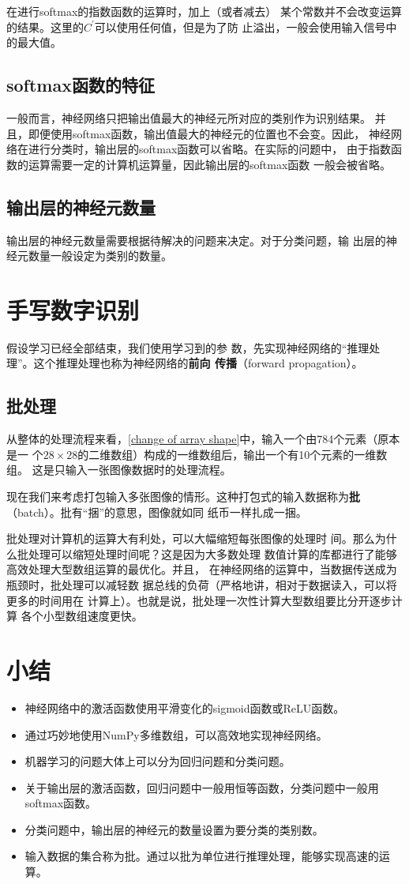 在进行softmax的指数函数的运算时，加上（或者减去）
某个常数并不会改变运算的结果。这里的$C^{'}$可以使用任何值，但是为了防
止溢出，一般会使用输入信号中的最大值。
\subsection{softmax函数的特征}
一般而言，神经网络只把输出值最大的神经元所对应的类别作为识别结果。
并且，即便使用softmax函数，输出值最大的神经元的位置也不会变。因此，
神经网络在进行分类时，输出层的softmax函数可以省略。在实际的问题中，
由于指数函数的运算需要一定的计算机运算量，因此输出层的softmax函数
一般会被省略。
\subsection{输出层的神经元数量}
输出层的神经元数量需要根据待解决的问题来决定。对于分类问题，输
出层的神经元数量一般设定为类别的数量。
\section{手写数字识别}
假设学习已经全部结束，我们使用学习到的参
数，先实现神经网络的“推理处理”。这个推理处理也称为神经网络的\textbf{前向
    传播}（forward propagation）。

\subsection{批处理}

从整体的处理流程来看，\autoref{change of array shape}中，输入一个由784个元素（原本是一
个$28\times 28$的二维数组）构成的一维数组后，输出一个有10个元素的一维数组。
这是只输入一张图像数据时的处理流程。

现在我们来考虑打包输入多张图像的情形。这种打包式的输入数据称为\textbf{批}（batch）。批有“捆”的意思，图像就如同
纸币一样扎成一捆。

\begin{tcolorbox}
    批处理对计算机的运算大有利处，可以大幅缩短每张图像的处理时
    间。那么为什么批处理可以缩短处理时间呢？这是因为大多数处理
    数值计算的库都进行了能够高效处理大型数组运算的最优化。并且，
    在神经网络的运算中，当数据传送成为瓶颈时，批处理可以减轻数
    据总线的负荷（严格地讲，相对于数据读入，可以将更多的时间用在
    计算上）。也就是说，批处理一次性计算大型数组要比分开逐步计算
    各个小型数组速度更快。
\end{tcolorbox}


\section{小结}
\begin{itemize}
    \item 神经网络中的激活函数使用平滑变化的sigmoid函数或ReLU函数。
    \item 通过巧妙地使用NumPy多维数组，可以高效地实现神经网络。
    \item 机器学习的问题大体上可以分为回归问题和分类问题。
    \item 关于输出层的激活函数，回归问题中一般用恒等函数，分类问题中一般用softmax函数。
    \item 分类问题中，输出层的神经元的数量设置为要分类的类别数。
    \item 输入数据的集合称为批。通过以批为单位进行推理处理，能够实现高速的运算。
\end{itemize}